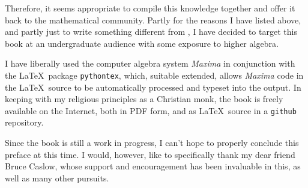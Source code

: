 Therefore, it seems appropriate to compile this knowledge together and
offer it back to the mathematical community.
Partly for the reasons I have listed above, and partly just to write
something different from \cite{bronstein book}, I have decided to
target this book at an undergraduate audience with some exposure to
higher algebra.

I have liberally used the computer algebra system
{\it Maxima} in conjunction with the \LaTeX\ package {\tt pythontex}, which,
suitable extended, allows {\it Maxima} code in the \LaTeX\ source to be
automatically processed and typeset into the output.  In keeping with
my religious principles as a Christian monk, the book is freely
available on the Internet, both in PDF form, and as \LaTeX\ source
in a {\tt github} repository.

Since the book is still a work in progress, I can't hope to properly
conclude this preface at this time.  I would, however, like to
specifically thank my dear friend Bruce Caslow, whose support and
encouragement has been invaluable in this, as well as many other
pursuits.

